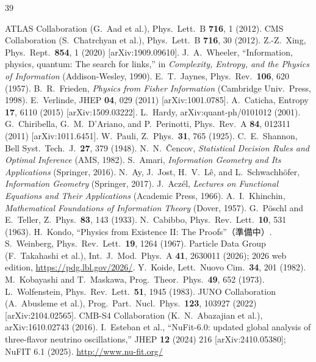 \documentclass[fontsize=11pt,paper=a4,lualatex]{jlreq}
\begin{document}
\begin{thebibliography}{39}
\setlength{\itemsep}{1pt}
\setlength{\parskip}{0pt}

 ATLAS Collaboration (G.~Aad et al.),
  Phys.\ Lett.\ B \textbf{716}, 1 (2012).
 CMS Collaboration (S.~Chatrchyan et al.),
  Phys.\ Lett.\ B \textbf{716}, 30 (2012).
 Z.-Z.~Xing, Phys.\ Rept.\ \textbf{854}, 1 (2020) [arXiv:1909.09610].
 J.~A.~Wheeler, ``Information, physics, quantum:
  The search for links,'' in \textit{Complexity, Entropy, and the
  Physics of Information} (Addison-Wesley, 1990).
 E.~T.~Jaynes, Phys.\ Rev.\ \textbf{106}, 620 (1957).
 B.~R.~Frieden, \textit{Physics from Fisher Information}
  (Cambridge Univ.\ Press, 1998).
 E.~Verlinde, JHEP \textbf{04}, 029 (2011)
  [arXiv:1001.0785].
 A.~Caticha, Entropy \textbf{17}, 6110 (2015)
  [arXiv:1509.03222].
 L.~Hardy, arXiv:quant-ph/0101012 (2001).
 G.~Chiribella, G.~M.~D'Ariano, and P.~Perinotti,
  Phys.\ Rev.\ A \textbf{84}, 012311 (2011) [arXiv:1011.6451].
 W.~Pauli, Z.\ Phys.\ \textbf{31}, 765 (1925).
 C.~E.~Shannon, Bell Syst.\ Tech.\ J.\ \textbf{27}, 379 (1948).
 N.~N.~\v{C}encov, \textit{Statistical Decision Rules
  and Optimal Inference} (AMS, 1982).
 S.~Amari, \textit{Information Geometry and Its Applications}
  (Springer, 2016).
 N.~Ay, J.~Jost, H.~V.~L\^e, and L.~Schwachh\"ofer,
  \textit{Information Geometry} (Springer, 2017).
 J.~Acz\'el, \textit{Lectures on Functional Equations and Their Applications}
  (Academic Press, 1966).
 A.~I.~Khinchin, \textit{Mathematical Foundations of
  Information Theory} (Dover, 1957).
 G.~P\"oschl and E.~Teller,
  Z.\ Phys.\ \textbf{83}, 143 (1933).
 N.~Cabibbo, Phys.\ Rev.\ Lett.\ \textbf{10}, 531 (1963).
 H.~Kondo, ``Physics from Existence II: The Proofs''（準備中）.
 S.~Weinberg, Phys.\ Rev.\ Lett.\ \textbf{19}, 1264 (1967).
 Particle Data Group (F.~Takahashi et al.),
  Int.\ J.\ Mod.\ Phys.\ A \textbf{41}, 2630011 (2026);
  2026 web edition, \url{https://pdg.lbl.gov/2026/}.
 Y.~Koide, Lett.\ Nuovo Cim.\ \textbf{34}, 201 (1982).
 M.~Kobayashi and T.~Maskawa,
  Prog.\ Theor.\ Phys.\ \textbf{49}, 652 (1973).
 L.~Wolfenstein, Phys.\ Rev.\ Lett.\ \textbf{51}, 1945 (1983).
 JUNO Collaboration (A.~Abusleme et al.),
  Prog.\ Part.\ Nucl.\ Phys.\ \textbf{123}, 103927 (2022) [arXiv:2104.02565].
 CMB-S4 Collaboration (K.~N.~Abazajian et al.),
  arXiv:1610.02743 (2016).
 I.~Esteban et al., ``NuFit-6.0: updated global analysis of three-flavor neutrino oscillations,'' JHEP \textbf{12} (2024) 216
  [arXiv:2410.05380]; NuFIT 6.1 (2025). \url{http://www.nu-fit.org/}


\end{thebibliography}
\end{document}
